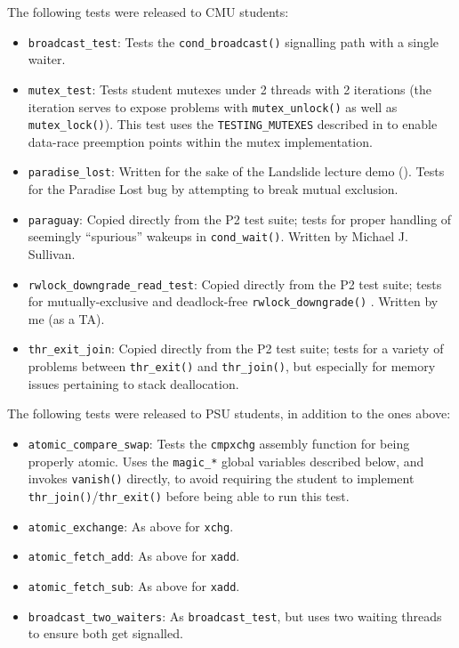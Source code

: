 
The following tests were released to CMU students:
\begin{itemize}
	\item {\tt broadcast\_test}:
		Tests the {\tt cond\_broadcast()} signalling path with a single waiter.
	\item {\tt mutex\_test}:
		Tests student mutexes under 2 threads with 2 iterations
		(the  iteration serves to expose problems with {\tt mutex\_unlock()} as well as {\tt mutex\_lock()}).
		This test uses the {\tt TESTING\_MUTEXES}
		described in \sect{\ref{sec:landslide-staticconfig}}
		to enable data-race preemption points within the mutex implementation.
	\item {\tt paradise\_lost}:
		Written for the sake of the Landslide lecture demo
		(\sect{\ref{sec:education-pebbles-recruiting}}).
		Tests for the Paradise Lost bug by attempting to break mutual exclusion.
	\item {\tt paraguay}:
		Copied directly from the P2 test suite;
		tests for proper handling of seemingly ``spurious'' wakeups in {\tt cond\_wait()}.
		Written by Michael J. Sullivan.
	\item {\tt rwlock\_downgrade\_read\_test}:
		Copied directly from the P2 test suite;
		tests for mutually-exclusive and deadlock-free {\tt rwlock\_downgrade()}
		.
		Written by me (as a TA).
	\item {\tt thr\_exit\_join}:
		Copied directly from the P2 test suite;
		tests for a variety of problems between {\tt thr\_exit()} and {\tt thr\_join()},
		but especially for memory issues pertaining to stack deallocation.
\end{itemize}
\vspace{1em}

\noindent The following tests were released to PSU students, in addition to the ones above:
\begin{itemize}
	\item {\tt atomic\_compare\_swap}:
		Tests the {\tt cmpxchg} assembly function for being properly atomic.
		Uses the {\tt magic\_*} global variables described below, and invokes {\tt vanish()} directly,
		to avoid requiring the student to implement {\tt thr\_join()}/{\tt thr\_exit()}
		before being able to run this test.
	\item {\tt atomic\_exchange}:
		As above for {\tt xchg}.
	\item {\tt atomic\_fetch\_add}:
		As above for {\tt xadd}.
	\item {\tt atomic\_fetch\_sub}:
		As above for {\tt xadd}.
	\item {\tt broadcast\_two\_waiters}:
		As {\tt broadcast\_test}, but uses two waiting threads to ensure both get signalled.
\end{itemize}
\vspace{1em}

